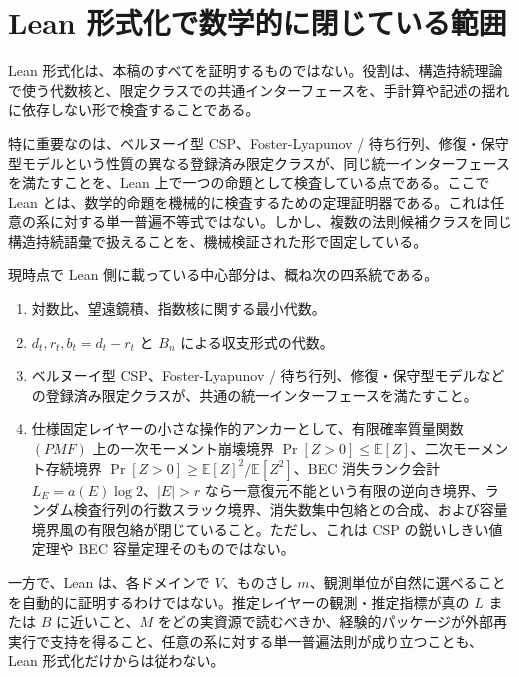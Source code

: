 \documentclass[12pt,a4paper]{article}
\begin{document}
\section{Lean 形式化で数学的に閉じている範囲}\label{lean-ux5f62ux5f0fux5316ux3067ux6570ux5b66ux7684ux306bux9589ux3058ux3066ux3044ux308bux7bc4ux56f2}

Lean 形式化は、本稿のすべてを証明するものではない。役割は、構造持続理論で使う代数核と、限定クラスでの共通インターフェースを、手計算や記述の揺れに依存しない形で検査することである。

特に重要なのは、ベルヌーイ型 CSP、Foster-Lyapunov / 待ち行列、修復・保守型モデルという性質の異なる登録済み限定クラスが、同じ統一インターフェースを満たすことを、Lean 上で一つの命題として検査している点である。ここで Lean とは、数学的命題を機械的に検査するための定理証明器である。これは任意の系に対する単一普遍不等式ではない。しかし、複数の法則候補クラスを同じ構造持続語彙で扱えることを、機械検証された形で固定している。

現時点で Lean 側に載っている中心部分は、概ね次の四系統である。

\begin{enumerate}
\def\labelenumi{\arabic{enumi}.}
\tightlist
\item
  対数比、望遠鏡積、指数核に関する最小代数。
\item
  \(d_{t},r_{t},b_{t}=d_{t}-r_{t}\) と \(B_{n}\) による収支形式の代数。
\item
  ベルヌーイ型 CSP、Foster-Lyapunov / 待ち行列、修復・保守型モデルなどの登録済み限定クラスが、共通の統一インターフェースを満たすこと。
\item
  仕様固定レイヤーの小さな操作的アンカーとして、有限確率質量関数 \((PMF)\) 上の一次モーメント崩壊境界 \(\Pr[Z>0]\le\mathbb E[Z]\)、二次モーメント存続境界 \(\Pr[Z>0]\ge\mathbb E[Z]^2/\mathbb E[Z^2]\)、BEC 消失ランク会計 \(L_{E}=a(E)\log 2\)、\(|E|>r\) なら一意復元不能という有限の逆向き境界、ランダム検査行列の行数スラック境界、消失数集中包絡との合成、および容量境界風の有限包絡が閉じていること。ただし、これは CSP の鋭いしきい値定理や BEC 容量定理そのものではない。
\end{enumerate}

一方で、Lean は、各ドメインで \(V\)、ものさし \(m\)、観測単位が自然に選べることを自動的に証明するわけではない。推定レイヤーの観測・推定指標が真の \(L\) または \(B\) に近いこと、\(M\) をどの実資源で読むべきか、経験的パッケージが外部再実行で支持を得ること、任意の系に対する単一普遍法則が成り立つことも、Lean 形式化だけからは従わない。
\end{document}
